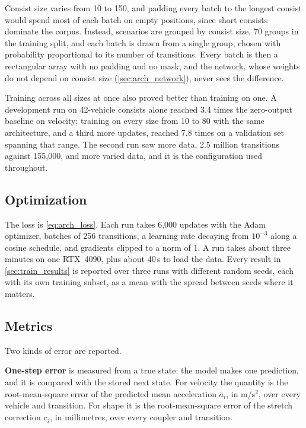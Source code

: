 Consist size varies from 10 to 150, and padding every batch to the longest consist would spend most of each batch on empty positions, since short consists dominate the corpus. Instead, scenarios are grouped by consist size, 70 groups in the training split, and each batch is drawn from a single group, chosen with probability proportional to its number of transitions. Every batch is then a rectangular array with no padding and no mask, and the network, whose weights do not depend on consist size (\cref{sec:arch_network}), never sees the difference.

Training across all sizes at once also proved better than training on one. A development run on 42-vehicle consists alone reached 3.4 times the zero-output baseline on velocity; training on every size from 10 to 80 with the same architecture, and a third more updates, reached 7.8 times on a validation set spanning that range. The second run saw more data, 2.5 million transitions against 155,000, and more varied data, and it is the configuration used throughout.

\subsection{Optimization}

The loss is \cref{eq:arch_loss}. Each run takes 6,000 updates with the Adam optimizer, batches of 256 transitions, a learning rate decaying from $10^{-3}$ along a cosine schedule, and gradients clipped to a norm of 1. A run takes about three minutes on one RTX~4090, plus about 40\,s to load the data. Every result in \cref{sec:train_results} is reported over three runs with different random seeds, each with its own training subset, as a mean with the spread between seeds where it matters.

\subsection{Metrics}

Two kinds of error are reported.

\textbf{One-step error} is measured from a true state: the model makes one prediction, and it is compared with the stored next state. For velocity the quantity is the root-mean-square error of the predicted mean acceleration $\bar a_i$, in m/s$^2$, over every vehicle and transition. For shape it is the root-mean-square error of the stretch correction $c_j$, in millimetres, over every coupler and transition.

